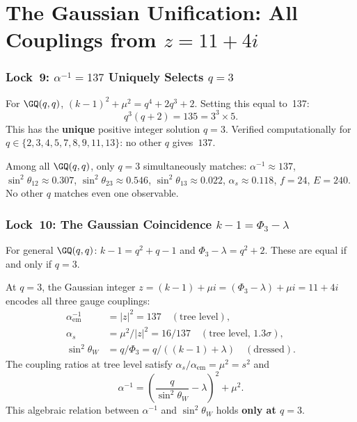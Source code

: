\clearpage
\part{\texorpdfstring{The Gaussian Unification: All Couplings from $z=11+4i$}{The Gaussian Unification: All Couplings from z=11+4i}}

\section{\texorpdfstring{Lock~9: $\alpha^{-1}=137$ Uniquely Selects $q=3$}{Lock 9: alpha-inverse equals 137 uniquely selects q=3}}

For $\GQ(q,q)$, $(k{-}1)^2+\mu^2 = q^4+2q^3+2$.
Setting this equal to~137:
\begin{equation}
\boxed{q^3(q+2) = 135 = 3^3\times 5.}
\end{equation}
This has the \textbf{unique} positive integer solution $q=3$.
Verified computationally for $q\in\{2,3,4,5,7,8,9,11,13\}$:
no other $q$ gives~$137$.

\begin{theorem}
Among all $\GQ(q,q)$, only $q=3$ simultaneously matches:
$\alpha^{-1}\approx 137$,
$\sin^2\theta_{12}\approx 0.307$,
$\sin^2\theta_{23}\approx 0.546$,
$\sin^2\theta_{13}\approx 0.022$,
$\alpha_s\approx 0.118$,
$f = 24$,
$E = 240$.
No other $q$ matches even one observable.
\end{theorem}


\section{\texorpdfstring{Lock~10: The Gaussian Coincidence $k{-}1=\Phi_3{-}\lambda$}{Lock 10: The Gaussian Coincidence k-1 = Phi3-lambda}}

For general $\GQ(q,q)$: $k{-}1=q^2{+}q{-}1$ and $\Phi_3{-}\lambda=q^2{+}2$.
These are equal if and only if $q=3$.

\begin{theorem}
\label{thm:gaussian}
At $q=3$, the Gaussian integer $z = (k{-}1)+\mu i = (\Phi_3{-}\lambda)+\mu i
= 11+4i$ encodes all three gauge couplings:
\begin{align}
\alpha_{\mathrm{em}}^{-1} &= |z|^2 = 137 \quad (\text{tree level}), \\
\alpha_s &= \mu^2/|z|^2 = 16/137 \quad (\text{tree level, $1.3\sigma$}), \\
\sin^2\theta_W &= q/\Phi_3 = q/((k{-}1)+\lambda) \quad (\text{dressed}).
\end{align}
The coupling ratios at tree level satisfy $\alpha_s/\alpha_{\mathrm{em}} = \mu^2 = s^2$
and
\begin{equation}
\alpha^{-1} = \left(\frac{q}{\sin^2\theta_W} - \lambda\right)^2 + \mu^2.
\end{equation}
This algebraic relation between $\alpha^{-1}$ and $\sin^2\theta_W$
holds \textbf{only at $q=3$}.
\end{theorem}


